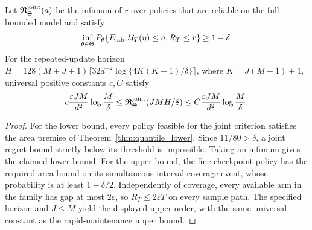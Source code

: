 \begin{corollary}
\label{cor:joint_quantile}
Let $\mathfrak R^{\rm joint}_\Theta(a)$ be the infimum of $r$ over policies
that are reliable on the full bounded model and satisfy
\[
 \inf_{\theta\in\Theta}
 P_\theta\{E_{\rm lab},\mathcal U_T(\eta)\le a,R_T\le r\}\ge1-\delta.
\]
For the repeated-update horizon
$H=128(M+J+1)\lceil32d^{-2}\log\{4K(K+1)/\delta\}\rceil$,
where $K=J(M+1)+1$, universal positive constants $c,C$ satisfy
\[
 c\frac{\varepsilon JM}{d^2}\log\frac M\delta
 \le\mathfrak R^{\rm joint}_\Theta(JMH/8)
 \le C\frac{\varepsilon JM}{d^2}\log\frac M\delta.
\]
\end{corollary}
\begin{proof}
For the lower bound, every policy feasible for the joint criterion satisfies
the area premise of Theorem~\ref{thm:quantile_lower}. Since
$11/80>\delta$, a joint regret bound strictly below its threshold is
impossible. Taking an infimum gives the claimed lower bound.
For the upper bound, the fine-checkpoint policy has the required area bound
on its simultaneous interval-coverage event, whose probability is at least
$1-\delta/2$. Independently of coverage, every available arm in the family has
gap at most $2\varepsilon$, so $R_T\le2\varepsilon T$ on every sample path.
The specified horizon and $J\le M$ yield the displayed upper order, with the
same universal constant as the rapid-maintenance upper bound.
\end{proof}
